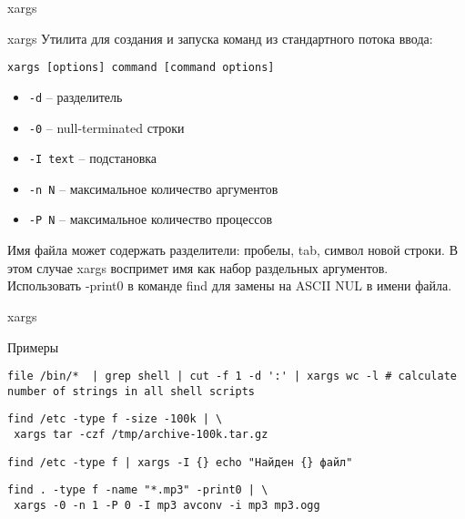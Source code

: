 \begin{frame}[fragile]{xargs}
	\begin{block}{xargs}
			Утилита для создания и запуска команд из стандартного потока ввода:
		\begin{verbatim}
xargs [options] command [command options]
		\end{verbatim}

		\begin{itemize}
			\item {\tt -d} -- разделитель
			\item {\tt -0} -- null-terminated строки
			\item {\tt -I text} -- подстановка
			\item {\tt -n N} -- максимальное количество аргументов
			\item {\tt -P N} -- максимальное количество процессов
		\end{itemize}

	\end{block}
Имя файла может содержать разделители: пробелы, tab, символ новой строки. В этом случае xargs воспримет имя как набор раздельных аргументов. Использовать -print0 в команде find для замены на ASCII NUL в имени файла.
\end{frame}

\begin{frame}[fragile]{xargs}
	\begin{block}{Примеры}

		\begin{verbatim}
file /bin/*  | grep shell | cut -f 1 -d ':' | xargs wc -l # calculate number of strings in all shell scripts
		\end{verbatim}

		\begin{verbatim}
find /etc -type f -size -100k | \
 xargs tar -czf /tmp/archive-100k.tar.gz
		\end{verbatim}


		\begin{verbatim}
find /etc -type f | xargs -I {} echo "Найден {} файл"
		\end{verbatim}

		\begin{verbatim}
find . -type f -name "*.mp3" -print0 | \
 xargs -0 -n 1 -P 0 -I mp3 avconv -i mp3 mp3.ogg
		\end{verbatim}
	
	\end{block}
\end{frame}

